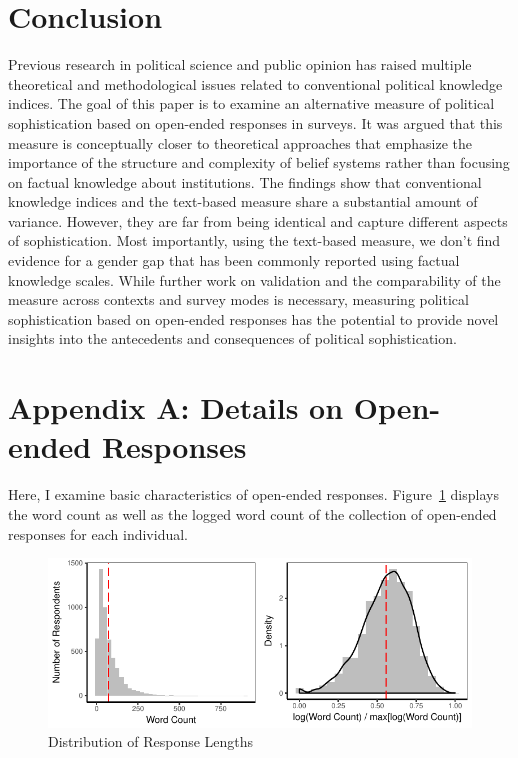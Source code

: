 \documentclass[12pt]{article}
\begin{document}
\section*{Conclusion}

Previous research in political science and public opinion has raised multiple theoretical and methodological issues related to conventional political knowledge indices. The goal of this paper is to examine an alternative measure of political sophistication based on open-ended responses in surveys. It was argued that this measure is conceptually closer to theoretical approaches that emphasize the importance of the structure and complexity of belief systems rather than focusing on factual knowledge about institutions. The findings show that conventional knowledge indices and the text-based measure share a substantial amount of variance. However, they are far from being identical and capture different aspects of sophistication. Most importantly, using the text-based measure, we don't find evidence for a gender gap that has been commonly reported using factual knowledge scales. While further work on validation and the comparability of the measure across contexts and survey modes is necessary, measuring political sophistication based on open-ended responses has the potential to provide novel insights into the antecedents and consequences of political sophistication.


\clearpage\singlespacing\footnotesize



\clearpage
\section*{Appendix A: Details on Open-ended Responses}
\renewcommand\thefigure{A.\arabic{figure}}
\renewcommand\thetable{A.\arabic{table}}
\setcounter{figure}{0}
\setcounter{table}{0}

Here, I examine basic characteristics of open-ended responses. Figure~\ref{fig:wc} displays the word count as well as the logged word count of the collection of open-ended responses for each individual.

\begin{figure}[h]\centering
\includegraphics{../fig/wc.pdf}
\caption{Distribution of Response Lengths}\label{fig:wc}
\end{figure}
\end{document}
